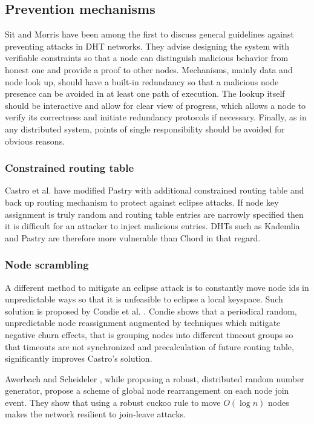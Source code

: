   \subsection{Prevention mechanisms}

  Sit and Morris \cite{sit02} have been among the first to discuss general
  guidelines against preventing attacks in DHT networks. They advise designing
  the system with verifiable constraints so that a node can distinguish
  malicious behavior from honest one and provide a proof to other nodes.
  Mechanisms, mainly data and node look up, should have a built-in redundancy so
  that a malicious node presence can be avoided in at least one path of
  execution. The lookup itself should be interactive and allow for clear view of
  progress, which allows a node to verify its correctness and initiate
  redundancy protocols if necessary. Finally, as in any distributed system,
  points of single responsibility should be avoided for obvious reasons.
  
  \subsubsection{Constrained routing table}
  Castro et al. \cite[p. 20]{urd11} have modified Pastry with additional
  constrained routing table and back up routing mechanism to protect against
  eclipse attacks. If node key assignment is truly random and routing table
  entries are narrowly specified then it is difficult for an attacker to inject
  malicious entries. DHTs such as Kademlia and Pastry are therefore more
  vulnerable than Chord in that regard.

  \subsubsection{Node scrambling}
  A different method to mitigate an eclipse attack is to constantly move node
  ids in unpredictable ways so that it is unfeasible to eclipse a local
  keyspace. Such solution is proposed by Condie et al. \cite[p. 21]{urd11}.
  Condie shows that a periodical random, unpredictable node reassignment
  augmented by techniques which mitigate negative churn effects, that is
  grouping nodes into different timeout groups so that timeouts are not
  synchronized and precalculation of future routing table, significantly
  improves Castro's solution.

  Awerbach and Scheideler \cite{awe10}, while proposing a robust, distributed
  random number generator, propose a scheme of global node rearrangement on each
  node join event. They show that using a robust cuckoo rule to move $O(\log n)$
  nodes makes the network resilient to join-leave attacks.

